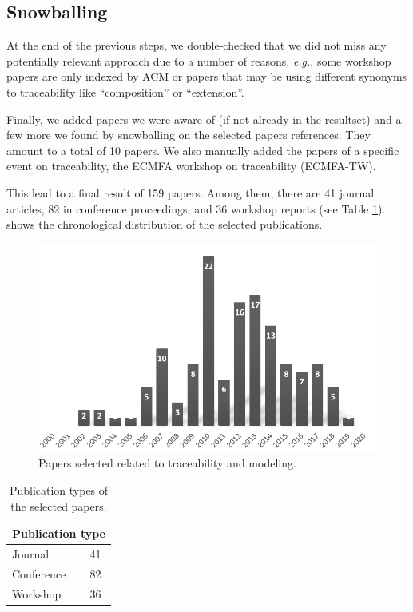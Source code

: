 \subsection{Snowballing}
At the end of the previous steps, we double-checked that we did not miss any potentially relevant approach due to a number of reasons, \textit{e.g.}, some workshop papers are only indexed by ACM or papers that may be using different synonyms to traceability like ``composition'' or ``extension''. 

Finally, we added papers we were aware of (if not already in the resultset) and a few more we found by snowballing on the selected papers references. They amount to a total of 10 papers. We also manually added the papers of a specific event on traceability, the ECMFA workshop on traceability (\ie ECMFA-TW). 

This lead to a final result of 159 papers. Among them, there are 41 journal articles, 82 in conference proceedings, and 36 workshop reports (see Table \ref{tab:classification-tm}).
 shows the chronological distribution of the selected publications.


\begin{figure}[h]
	\centering
	\includegraphics[width=.9\linewidth]{images/publicationyears-tm}
	\caption{Papers selected related to traceability and modeling. }
	\label{fig:publicationyears-tm}	
\end{figure}

\begin{table}[h]
	\centering
	\begin{tabular}{|ll|}
		\hline
		\multicolumn{2}{|l|}{\textbf{Publication type}}  \\ \hline
		\multicolumn{1}{|l}{Journal}          & 41       \\ \hline
		\multicolumn{1}{|l}{Conference}       & 82       \\ \hline
		\multicolumn{1}{|l}{Workshop}         & 36       \\ \hline
	\end{tabular}
	\caption{Publication types of the selected papers.}
	\label{tab:classification-tm}
\end{table}



